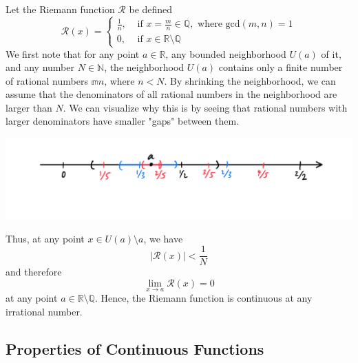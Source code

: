 \documentclass{article}
\begin{document}
    \begin{example}
      Let the Riemann function $\mathcal{R}$ be defined
      \[\mathcal{R}(x) = \begin{cases}
      \frac{1}{n}, & \text{ if } x = \frac{m}{n} \in \mathbb{Q}, \text{ where gcd}(m, n) = 1 \\
      0, & \text{ if } x \in \mathbb{R} \setminus \mathbb{Q}
      \end{cases}\]
      We first note that for any point $a \in \mathbb{R}$, any bounded neighborhood $U(a)$ of it, and any number $N \in \mathbb{N}$, the neighborhood $U(a)$ contains only a finite number of rational numbers $\mathbb{m}{n}$, where $n < N$. By shrinking the neighborhood, we can assume that the denominators of all rational numbers in the neighborhood are larger than $N$. We can visualize why this is by seeing that rational numbers with larger denominators have smaller "gaps" between them. 
      \begin{center}
          \includegraphics[scale=0.23]{img/Rationals_Spread_Apart.PNG}
      \end{center}
      Thus, at any point $x \in U(a) \setminus a$, we have 
      \[\big| \mathcal{R}(x) \big| < \frac{1}{N}\]
      and therefore
      \[\lim_{x \rightarrow a} \mathcal{R} (x) = 0\]
      at any point $a \in \mathbb{R} \setminus \mathbb{Q}$. Hence, the Riemann function is continuous at any irrational number. 
    \end{example}

  \subsection{Properties of Continuous Functions}
\end{document}
